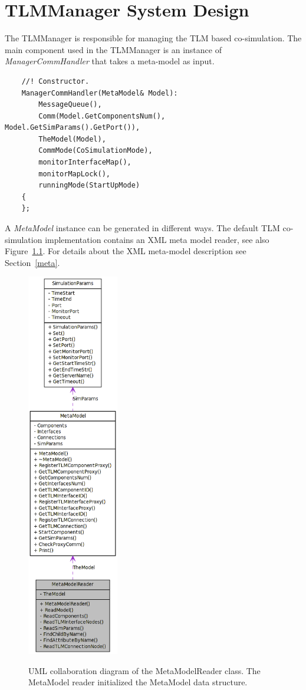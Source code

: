 \chapter{TLMManager System Design}
The TLMManager is responsible for managing the TLM based
co-simulation. The main component used in the TLMManager is an
instance of {\em ManagerCommHandler} that takes a meta-model as input.
{\scriptsize
\begin{verbatim}
    //! Constructor.
    ManagerCommHandler(MetaModel& Model):
        MessageQueue(),
        Comm(Model.GetComponentsNum(), Model.GetSimParams().GetPort()),
        TheModel(Model),
        CommMode(CoSimulationMode),
        monitorInterfaceMap(),
        monitorMapLock(),
        runningMode(StartUpMode)
    {
    };
\end{verbatim}
}

A {\em MetaModel} instance can be generated in different ways. The
default TLM co-simulation implementation contains an XML meta model
reader, see also Figure~\ref{fig:MetaModelReader}. For details about
the XML meta-model description see Section~\ref{meta}.

\begin{figure}[ht]
\begin{center}
  {\includegraphics[width=4cm]{figs/classMetaModelReader__coll__graph.png}}
\end{center}
\caption{UML collaboration diagram of the MetaModelReader class. The
  MetaModel reader initialized the MetaModel data structure.}
\label{fig:MetaModelReader}
\end{figure}

